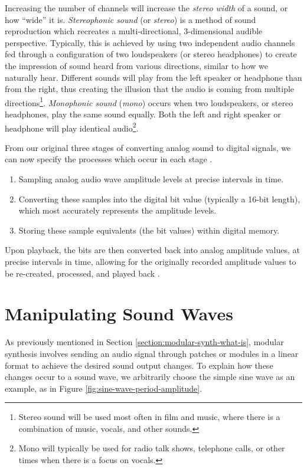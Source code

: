 Increasing the number of channels will increase the \textit{stereo width} of a sound, or how ``wide'' it is. \textit{Stereophonic sound} (or \textit{stereo}) is a method of sound reproduction which recreates a multi-directional, 3-dimensional audible perspective. Typically, this is achieved by using two independent audio channels fed through a configuration of two loudspeakers (or stereo headphones) to create the impression of sound heard from various directions, similar to how we naturally hear. Different sounds will play from the left speaker or headphone than from the right, thus creating the illusion that the audio is coming from multiple directions\footnote{Stereo sound will be used most often in film and music, where there is a combination of music, vocals, and other sounds.}. \textit{Monophonic sound} (\textit{mono}) occurs when two loudspeakers, or stereo headphones, play the same sound equally. Both the left and right speaker or headphone will play identical audio\footnote{Mono will typically be used for radio talk shows, telephone calls, or other times when there is a focus on vocals.}.  

From our original three stages of converting analog sound to digital signals, we can now specify the processes which occur in each stage \cite{Huber_Runstein_2018}. 

\begin{enumerate}
	\item Sampling analog audio wave amplitude levels at precise intervals in time.
	\item Converting these samples into the digital bit value (typically a 16-bit length), which most accurately represents the amplitude levels.
	\item Storing these sample equivalents (the bit values) within digital memory.
\end{enumerate}

Upon playback, the bits are then converted back into analog amplitude values, at precise intervals in time, allowing for the originally recorded amplitude values to be re-created, processed, and played back \cite{Huber_Runstein_2018}. 

\section{Manipulating Sound Waves}\label{section:manip-waves}
As previously mentioned in Section \ref{section:modular-synth-what-is}, modular synthesis involves sending an audio signal through patches or modules in a linear format to achieve the desired sound output changes. To explain how these changes occur to a sound wave, we arbitrarily choose the simple sine wave as an example, as in Figure \ref{fig:sine-wave-period-amplitude}. 

